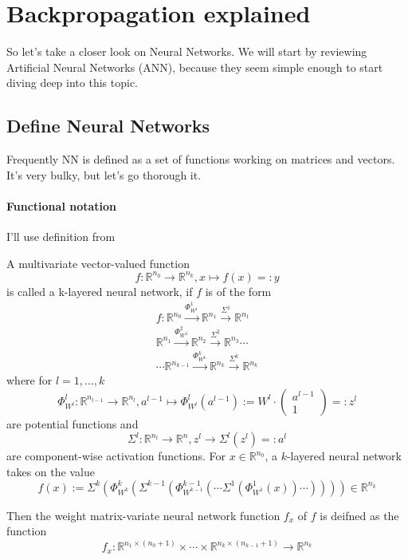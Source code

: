 \documentclass[draft]{article}
\def\RealSet{\mathbb{R}}
\begin{document}
\section{Backpropagation explained}


So let's take a closer look on Neural Networks. We will start by reviewing Artificial Neural Networks (ANN), because they seem simple enough to start diving deep into this topic.


\subsection{Define Neural Networks}

Frequently NN is defined as a set of functions working on matrices and vectors. It's very bulky, but let's go thorough it. 

\paragraph{Functional notation}
I'll use definition from \cite{Ostwald:2021}

A multivariate vector-valued function
\[
f \colon \RealSet^{n_0} \rightarrow \RealSet^{n_k}, x\mapsto f(x)=:y
\]
is called a k-layered neural network, if $f$ is of the form
\begin{multline}
f \colon \RealSet^{n_0} \xrightarrow{\Phi_{W^1}^1} \RealSet^{n_1}
\xrightarrow{\Sigma^1} \RealSet^{n_1} \\
\RealSet^{n_1} \xrightarrow{\Phi_{W^2}^2} \RealSet^{n_2}
\xrightarrow{\Sigma^2} \RealSet^{n_3} \cdots \\
\cdots \RealSet^{n_{k-1}}
\xrightarrow{\Phi_{W^k}^k} \RealSet^{n_k}
\xrightarrow{\Sigma^k} \RealSet^{n_k}
\end{multline}
where for $l=1,\ldots,k$
\[
\Phi_{W^l}^l \colon \RealSet^{n_{l-1}} \rightarrow \RealSet^{n_l}, 
a^{l-1}\mapsto \Phi_{W^l}^l(a^{l-1}) :=W^l \cdot \begin{pmatrix} a^{l-1} \\ 1 \end{pmatrix} =: z^l
\]
are potential functions and
\[
\Sigma^l \colon \RealSet^{n_{l}} \rightarrow \RealSet^{n},
z^l \rightarrow \Sigma^l(z^l) =: a^l
\]
are component-wise activation functions. For $x\in \RealSet^{n_0}$, a $k$-layered neural network takes on the value
\[
f(x) := \Sigma^k( \Phi_{W^k}^k( \Sigma^{k-1}( \Phi_{W^{k-1}}^{k-1}(\cdots \Sigma^1( \Phi_{W^1}^1(x) ) \cdots) ) ) ) \in \RealSet^{n_k}
\]

Then the weight matrix-variate neural network function $f_x$ of $f$ is deifned as the function
\[
f_x \colon \RealSet^{n_1 \times (n_0 + 1)} \times \cdots \times \RealSet^{n_k \times (n_{k-1} + 1)} \rightarrow \RealSet^{n_k}
\]
\end{document}
